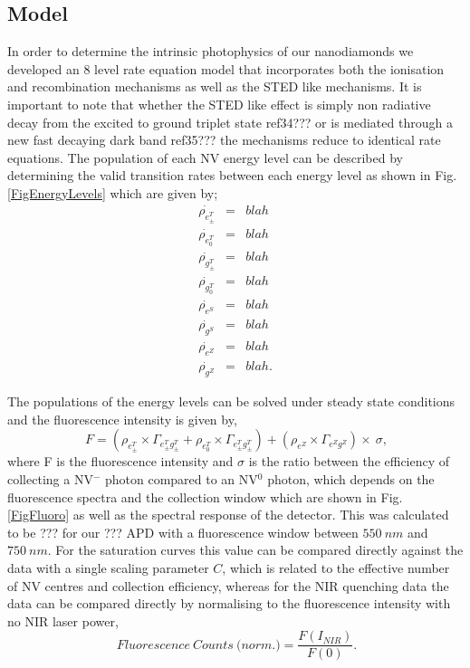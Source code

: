 \documentclass[preprint,prl]{revtex4}
\begin{document}
\subsection{Model}
In order to determine the intrinsic photophysics of our nanodiamonds we developed an 8 level rate equation model that incorporates both the ionisation and recombination mechanisms as well as the STED like mechanisms. It is important to note that whether the STED like effect is simply non radiative decay from the excited to ground triplet state ref34??? or is mediated through a new fast decaying dark band ref35??? the mechanisms reduce to identical rate equations. The population of each NV energy level can be described by determining the valid transition rates between each energy level as shown in Fig. \ref{FigEnergyLevels} which are given by;
\begin{eqnarray}
\dot{\rho_{e^{T}_\pm}} & = & blah\\ 
\dot{\rho_{e^{T}_0}} & = & blah\\
\dot{\rho_{g^{T}_\pm}} & = & blah\\ 
\dot{\rho_{g^{T}_0}} & = & blah\\
\dot{\rho_{e^S}} & = & blah\\ 
\dot{\rho_{g^S}} & = & blah\\ 
\dot{\rho_{e^Z}} & = & blah\\ 
\dot{\rho_{g^Z}} & = & blah.
\label{EqnArray}
\end{eqnarray}

The populations of the energy levels can be solved under steady state conditions and the fluorescence intensity is given by,
\begin{equation}
\SI{}{F} = \left(\rho_{e^{T}_\pm}\times\Gamma_{e^T_{\pm}g^T_{\pm}} +\rho_{e^{T}_0}\times\Gamma_{e^T_{\pm}g^T_{\pm}}\right)+\left(\rho_{e^Z}\times\Gamma_{e^Zg^Z}\right)\times\SI{}{\sigma},
\label{EqnFluoro}
\end{equation}
where F is the fluorescence intensity and $\sigma$ is the ratio between the efficiency of collecting a NV$^-$ photon compared to an NV$^0$ photon, which depends on the fluorescence spectra and the collection window which are shown in Fig. \ref{FigFluoro} as well as the spectral response of the detector. This was calculated to be ??? for our ??? APD with a fluorescence window between $\SI{550}{nm}$ and $\SI{750}{nm}$. For the saturation curves this value can be compared directly against the data with a single scaling parameter $C$, which is related to the effective number of NV centres and collection efficiency, whereas for the NIR quenching data the data can be compared directly by normalising to the fluorescence intensity with no NIR laser power,
\begin{equation}
\SI{}{Fluorescence\ Counts\ (norm}.) = \frac{F(I_{NIR})}{F(0)}.
\label{EqnFluoroCounts}
\end{equation}
\end{document}
